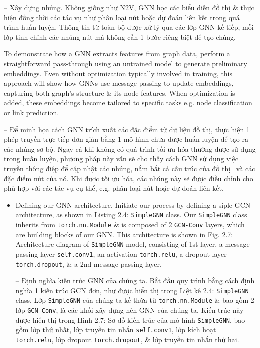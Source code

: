 \documentclass{article}
\begin{document}
\begin{itemize}
\begin{itemize}
\begin{itemize}
           -- {\sf Xây dựng nhúng.} Không giống như N2V, GNN học các biểu diễn đồ thị \& thực hiện đồng thời các tác vụ như phân loại nút hoặc dự đoán liên kết trong quá trình huấn luyện. Thông tin từ toàn bộ được xử lý qua các lớp GNN kế tiếp, mỗi lớp tinh chỉnh các nhúng nút mà không cần 1 bước riêng biệt để tạo chúng.

           To demonstrate how a GNN extracts features from graph data, perform a straightforward pass-through using an untrained model to generate preliminary embeddings. Even without optimization typically involved in training, this approach will show how GNNs use message passing to update embeddings, capturing both graph's structure \& its node features. When optimization is added, these embeddings become tailored to specific tasks e.g. node classification or link prediction.

           -- Để minh họa cách GNN trích xuất các đặc điểm từ dữ liệu đồ thị, thực hiện 1 phép truyền trực tiếp đơn giản bằng 1 mô hình chưa được huấn luyện để tạo ra các nhúng sơ bộ. Ngay cả khi không có quá trình tối ưu hóa thường được sử dụng trong huấn luyện, phương pháp này vẫn sẽ cho thấy cách GNN sử dụng việc truyền thông điệp để cập nhật các nhúng, nắm bắt cả cấu trúc của đồ thị \ và các đặc điểm nút của nó. Khi được tối ưu hóa, các nhúng này sẽ được điều chỉnh cho phù hợp với các tác vụ cụ thể, e.g. phân loại nút hoặc dự đoán liên kết.
           \begin{itemize}
               \item {\sf Defining our GNN architecture.} Initiate our process by defining a siple GCN architecture, as shown in {\sf Listing 2.4: {\tt SimpleGNN} class}. Our {\tt SimpleGNN} class inherits from {\tt torch.nn.Module} \& is composed of 2 {\tt GCN-Conv} layers, which are building blocks of our GNN. This architecture is shown in {\sf Fig. 2.7: Architecture diagram of {\tt SimpleGNN} model}, consisting of 1st layer, a message passing layer {\tt self.conv1}, an activation {\tt torch.relu}, a dropout layer {\tt torch.dropout}, \& a 2nd message passing layer.

               -- {\sf Định nghĩa kiến trúc GNN của chúng ta.} Bắt đầu quy trình bằng cách định nghĩa 1 kiến trúc GCN đơn, như được hiển thị trong {\sf Liệt kê 2.4: {\tt SimpleGNN} class}. Lớp {\tt SimpleGNN} của chúng ta kế thừa từ {\tt torch.nn.Module} \& bao gồm 2 lớp {\tt GCN-Conv}, là các khối xây dựng nên GNN của chúng ta. Kiến trúc này được hiển thị trong {\sf Hình 2.7: Sơ đồ kiến trúc của mô hình {\tt SimpleGNN}}, bao gồm lớp thứ nhất, lớp truyền tin nhắn {\tt self.conv1}, lớp kích hoạt {\tt torch.relu}, lớp dropout {\tt torch.dropout}, \& lớp truyền tin nhắn thứ hai.


\end{itemize}
\end{itemize}
\end{itemize}
\end{itemize}
\end{document}
